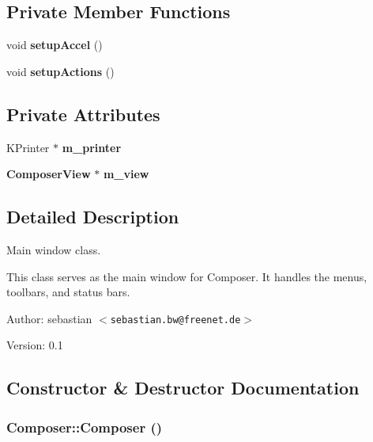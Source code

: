 \subsection*{Private Member Functions}
\begin{CompactItemize}
\item 
void {\bf setup\-Accel} ()
\item 
void {\bf setup\-Actions} ()
\end{CompactItemize}
\subsection*{Private Attributes}
\begin{CompactItemize}
\item 
KPrinter $\ast$ {\bf m\_\-printer}
\item 
{\bf Composer\-View} $\ast$ {\bf m\_\-view}
\end{CompactItemize}


\subsection{Detailed Description}
Main window class. 

This class serves as the main window for Composer. It handles the menus, toolbars, and status bars.

\begin{Desc}
\item[Author:]sebastian $<${\tt sebastian.bw@freenet.de}$>$ \end{Desc}
\begin{Desc}
\item[Version:]0.1 \end{Desc}




\subsection{Constructor \& Destructor Documentation}
\subsubsection{\setlength{\rightskip}{0pt plus 5cm}Composer::Composer ()}\label{classComposer_e480bff5dfb326b3f4e1e0787702066a}



